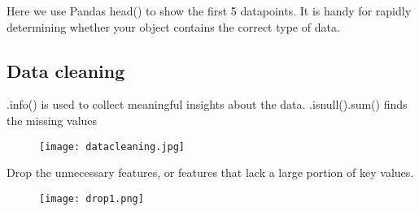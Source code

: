\documentclass[a4paper, 12pt]{article}
\begin{document}
Here we use Pandas head() to show the first 5 datapoints.  It is handy for rapidly determining whether your object contains the correct type of data.

\subsection{Data cleaning}
.info() is used to collect meaningful insights about the data. .isnull().sum() finds the missing values 
\begin{figure}[tbh]
    \centering
    \texttt{[image: datacleaning.jpg]}
\end{figure} 
\newpage
Drop the unnecessary features, or features that lack a large portion of key values.
\begin{figure}[tbh]
    \centering
    \texttt{[image: drop1.png]}
\end{figure}
\end{document}
